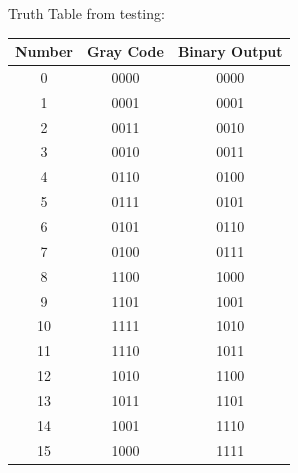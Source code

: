 \documentclass[12pt]{article}
\begin{document}
Truth Table from testing:
\begin{center}
    \begin{tabular}{| c | c c |}
        \hline
        \textbf{Number} & \textbf{Gray Code} & \textbf{Binary Output} \\
        \hline\hline
        0 & 0000 & 0000 \\
        1 & 0001 & 0001 \\
        2 & 0011 & 0010 \\
        3 & 0010 & 0011 \\
        4 & 0110 & 0100 \\
        5 & 0111 & 0101 \\
        6 & 0101 & 0110 \\
        7 & 0100 & 0111 \\
        8 & 1100 & 1000 \\
        9 & 1101 & 1001 \\
        10 & 1111 & 1010 \\
        11 & 1110 & 1011 \\
        12 & 1010 & 1100 \\
        13 & 1011 & 1101 \\
        14 & 1001 & 1110 \\
        15 & 1000 & 1111 \\
        \hline
    \end{tabular}
\end{center}
\end{document}
